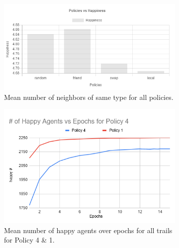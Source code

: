 \documentclass[a4paper,12pt]{article}
\begin{document}
  \begin{figure}[ht]
    \centering
    \begin{subfigure}[b]{0.59\linewidth}
      \includegraphics[width=\linewidth]{allPolicies.PNG}
      \caption{Mean number of neighbors of same type for all policies.}
      \label{fig:1.4.2}
    \end{subfigure}
    \begin{subfigure}[b]{0.40\linewidth}
      \includegraphics[width=\linewidth]{policy4HappinessVEpochs.PNG}
      \caption{Mean number of happy agents over epochs for all trails for Policy 4 \& 1.}
      \label{fig:1.4.3}
    \end{subfigure}
    \caption{}
  \end{figure}
\end{document}
